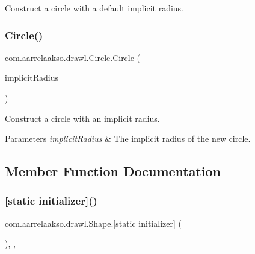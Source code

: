 Construct a circle with a default implicit radius. 

\mbox{\label{classcom_1_1aarrelaakso_1_1drawl_1_1_circle_aea0d67593f2077987e7258ed2adb57c5}} 
\subsubsection{\texorpdfstring{Circle()}{Circle()}\hspace{0.1cm}{\footnotesize\ttfamily [2/2]}}
{\footnotesize\ttfamily com.\+aarrelaakso.\+drawl.\+Circle.\+Circle (\begin{DoxyParamCaption}\item[{\hyperlink{classcom_1_1aarrelaakso_1_1drawl_1_1_drawl_number}{Drawl\+Number}}]{implicit\+Radius }\end{DoxyParamCaption})\hspace{0.3cm}{\ttfamily [protected]}}



Construct a circle with an implicit radius. 


\begin{DoxyParams}{Parameters}
{\em implicit\+Radius} & The implicit radius of the new circle. \\
\hline
\end{DoxyParams}


\subsection{Member Function Documentation}
\mbox{\label{classcom_1_1aarrelaakso_1_1drawl_1_1_shape_ad2adcb85374cf5d6d59429628314e8d1}} 
\subsubsection{\texorpdfstring{[static initializer]()}{[static initializer]()}}
{\footnotesize\ttfamily com.\+aarrelaakso.\+drawl.\+Shape.\mbox{[}static initializer\mbox{]} (\begin{DoxyParamCaption}{ }\end{DoxyParamCaption})\hspace{0.3cm}{\ttfamily [static]}, {\ttfamily [package]}, {\ttfamily [inherited]}}

